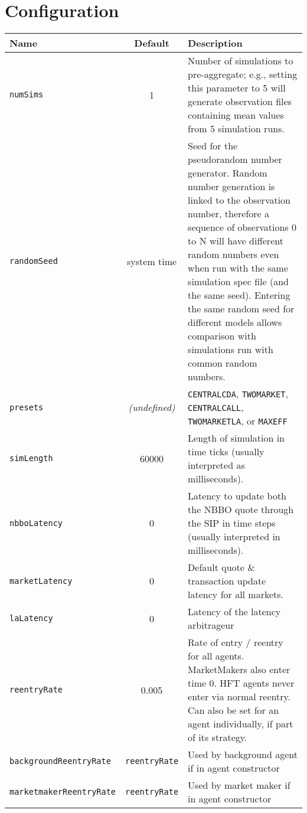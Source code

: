 \documentclass[11pt]{article}
\begin{document}
\section{Configuration}

\begin{table}
\centering
\begin{tabulary}{\textwidth}{lcL}\toprule
\textbf{Name}   & \textbf{Default} & \textbf{Description} \\ \midrule

\texttt{numSims} 		& 1 & Number of simulations to pre-aggregate; e.g., setting this parameter to 5 will generate observation files containing mean values from 5 simulation runs. \\
\texttt{randomSeed} 	& system time & Seed for the pseudorandom number generator. Random number generation is linked to the observation number, therefore a sequence of observations 0 to N will have different random numbers even when run with the same simulation spec file (and the same seed). Entering the same random seed for different models allows comparison with simulations run with common random numbers. \\
\texttt{presets}  		& \emph{(undefined)} & \texttt{CENTRALCDA},
\texttt{TWOMARKET}, \texttt{CENTRALCALL}, \texttt{TWOMARKETLA}, or \texttt{MAXEFF} \\

\texttt{simLength} 	& 60000 & Length of simulation in time ticks (usually interpreted as milliseconds). \\ 
\texttt{nbboLatency} 	& 0 & Latency to update both the NBBO quote through the SIP in time steps (usually interpreted in milliseconds).\\
\texttt{marketLatency} 	& 0 & Default quote \& transaction update latency for
all markets. \\
\texttt{laLatency} 	& 0 & Latency of the latency arbitrageur \\


\texttt{reentryRate} 	& 0.005 & Rate of entry / reentry for all
agents. MarketMakers also enter time 0. HFT agents never enter via normal
reentry. Can also be set for an agent individually, if part of its strategy.\\
\texttt{backgroundReentryRate} & \texttt{reentryRate} & Used by background agent if in agent constructor \\
\texttt{marketmakerReentryRate} & \texttt{reentryRate} & Used by market maker if in agent constructor \\


\end{tabulary}
\end{table}
\end{document}
